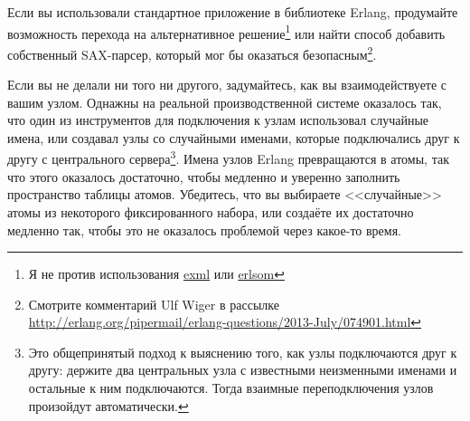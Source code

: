 Если вы использовали стандартное приложение  в библиотеке Erlang, продумайте возможность перехода на альтернативное решение\footnote{Я не против использования \href{https://github.com/paulgray/exml}{exml} или \href{https://github.com/willemdj/erlsom}{erlsom}} или найти способ добавить собственный SAX-парсер, который мог бы оказаться безопасным\footnote{Смотрите комментарий Ulf Wiger в рассылке \href{http://erlang.org/pipermail/erlang-questions/2013-July/074901.html}{http://erlang.org/pipermail/erlang-questions/2013-July/074901.html}}.

Если вы не делали ни того ни другого, задумайтесь, как вы взаимодействуете с вашим узлом. Однажны на реальной производственной системе оказалось так, что один из инструментов для подключения к узлам использовал случайные имена, или создавал узлы со случайными именами, которые подключались друг к другу с центрального сервера\footnote{Это общепринятый подход к выяснению того, как узлы подключаются друг к другу: держите два центральных узла с известными неизменными именами и остальные к ним подключаются. Тогда взаимные переподключения узлов произойдут автоматически.}. Имена узлов Erlang превращаются в атомы, так что этого оказалось достаточно, чтобы медленно и уверенно заполнить пространство таблицы атомов. Убедитесь, что вы выбираете <<случайные>> атомы из некоторого фиксированного набора, или создаёте их достаточно медленно так, чтобы это не оказалось проблемой через какое-то время.


